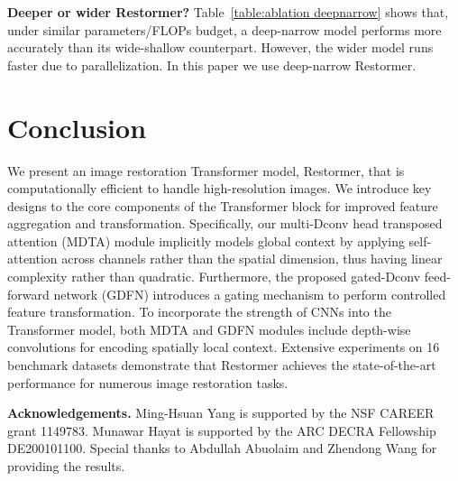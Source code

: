 \documentclass[10pt,twocolumn,letterpaper]{article}
\def\xnet{Restormer\xspace}
\begin{document}
\noindent \textbf{Deeper or wider \xnet?}
Table~\ref{table:ablation deepnarrow} shows that, under similar parameters/FLOPs budget, a deep-narrow model performs more accurately than its wide-shallow counterpart. However, the wider model runs faster due to parallelization. In this paper we use deep-narrow \xnet.


\section{Conclusion}
We present an image restoration Transformer model, \xnet, that is computationally efficient to handle high-resolution images. We introduce key designs to the core components of the Transformer block for improved feature aggregation and transformation. Specifically, our multi-Dconv head transposed attention (MDTA) module implicitly models global context by applying self-attention across channels rather than the spatial dimension, thus having linear complexity rather than quadratic. Furthermore, the proposed gated-Dconv feed-forward network (GDFN) introduces a gating mechanism to perform controlled feature transformation. 
To incorporate {the} strength of CNNs  into the Transformer model, both MDTA and GDFN modules include depth-wise convolutions for encoding spatially local context. Extensive experiments on 16 benchmark datasets demonstrate that \xnet achieves the state-of-the-art performance for numerous image restoration tasks.

\vspace{0.2em}
\noindent \textbf{Acknowledgements.} Ming-Hsuan Yang is supported by the NSF CAREER grant 1149783. Munawar Hayat is supported by the ARC DECRA Fellowship DE200101100. Special thanks to Abdullah Abuolaim and Zhendong Wang for providing the results. 

{\small


}
\end{document}
